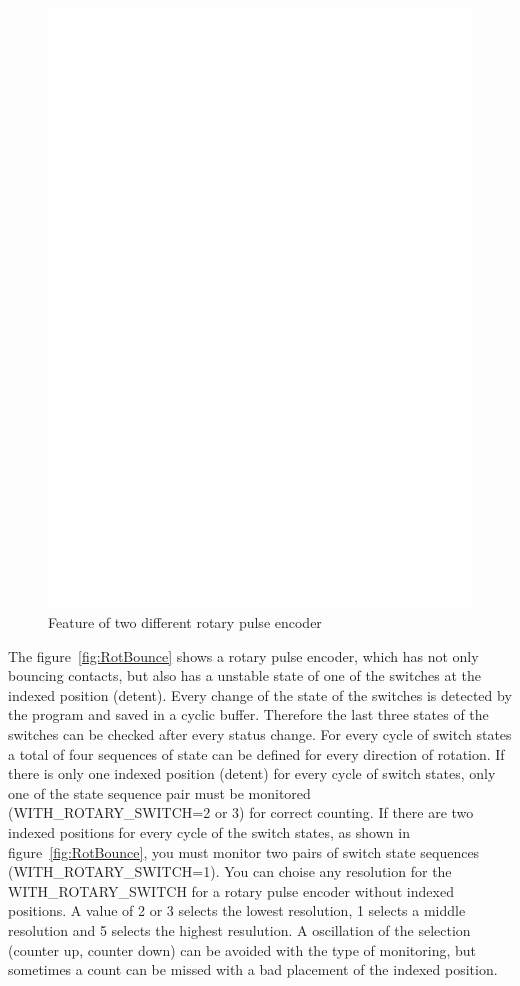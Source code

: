 \begin{figure}[H]
\centering
\includegraphics[width=14cm]{../FIG/rotary_encoder.eps}
\caption{Feature of two different rotary pulse encoder}
\label{fig:RotEnc}
\end{figure}

The figure~\ref{fig:RotBounce} shows a rotary pulse encoder, which has not only
bouncing contacts, but also has a unstable state of one of the switches at the indexed
position (detent). Every change of the state of the switches is detected by the program
and saved in a cyclic buffer. Therefore the last three states of the switches can be checked
after every status change.
For every cycle of switch states a total of four sequences of state can be defined for every direction of rotation.
If there is only one indexed position (detent) for every cycle of switch states, only
one of the state sequence pair must be monitored (WITH\_ROTARY\_SWITCH=2 or 3) for correct counting.
If there are two indexed positions for every cycle of the switch states, as shown in figure~\ref{fig:RotBounce},
you must monitor two pairs of switch state sequences (WITH\_ROTARY\_SWITCH=1).
You can choise any resolution for the WITH\_ROTARY\_SWITCH for a rotary pulse encoder without
indexed positions. A value of 2 or 3 selects the lowest resolution, 1 selects a middle resolution
and 5 selects the highest resulution.
A oscillation of the selection (counter up, counter down) can be avoided with the type of monitoring,
but sometimes a count can be missed with a bad placement of the indexed position.

